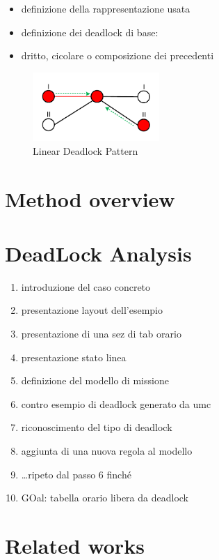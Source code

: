 \documentclass{ewic}
\begin{document}
\begin{itemize}
\item definizione della rappresentazione usata
\item definizione dei deadlock di base:
\item dritto, cicolare o composizione dei precedenti
\end{itemize}

\begin{figure}[htp]
	\begin{centering}	
	\includegraphics[width=0.43\textwidth, clip]{img/deadlinear}
	\caption{Linear Deadlock Pattern}
	\label{fig:linardeadlock}
	\end{centering}
\end{figure}

\section{Method overview}


\section{DeadLock Analysis}
\begin{enumerate}
\item introduzione del caso concreto
\item presentazione layout dell'esempio
\item presentazione di una sez di tab orario
\item presentazione stato linea
\item definizione del modello di missione
\item contro esempio di deadlock generato da umc
\item riconoscimento del tipo di deadlock
\item aggiunta di una nuova regola al modello
\item \ldots ripeto dal passo 6 finch\'{e}
\item GOal: tabella orario libera da deadlock
\end{enumerate}
%

\section{Related works}
%
\end{document}
